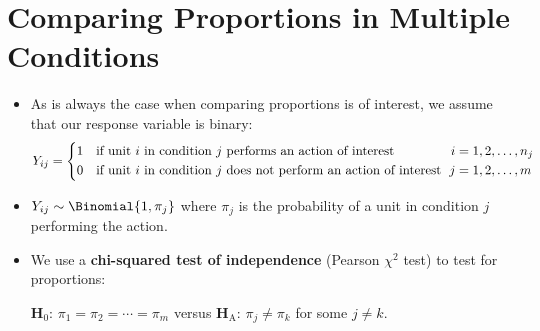 \section{Comparing Proportions in Multiple Conditions}
\begin{itemize}
      \item As is always the case when comparing proportions is of interest, we assume that our response variable
            is binary:
            \[ Y_{ij}=\begin{cases*}
                        1 & if unit $ i $ in condition $ j $ performs an action of interest         \\
                        0 & if unit $ i $ in condition $ j $ does not perform an action of interest
                  \end{cases*}\begin{aligned}
                        i & =1,2,\ldots,n_j \\
                        j & =1,2,\ldots,m
                  \end{aligned} \]
      \item $ Y_{ij}\sim \Binomial{1,\pi_j} $
            where $ \pi_j $ is the probability of a unit in condition $ j $ performing the action.
      \item We use a \textbf{chi-squared test of independence} (Pearson $ \chi^2 $ test) to test for proportions:
            \begin{tightcenter}
                  $ \mathbf{H}_0 $: $ \pi_1=\pi_2=\cdots=\pi_m $ versus $ \mathbf{H}_\text{A} $: $ \pi_j\ne \pi_k $ for some $ j\ne k $.
            \end{tightcenter}
\end{itemize}
